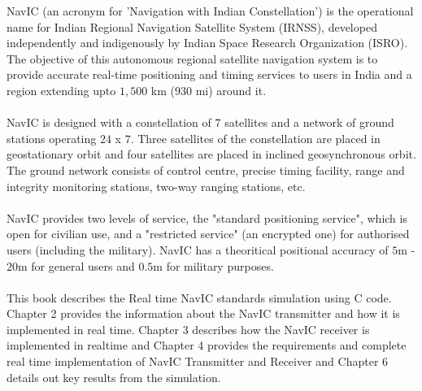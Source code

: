 




%


NavIC (an acronym for 'Navigation with Indian Constellation') is the operational name for Indian Regional Navigation Satellite System (IRNSS), developed independently and indigenously by Indian Space Research Organization (ISRO). The objective of this autonomous regional satellite navigation system is to provide accurate real-time positioning and timing services to users in India and a region extending upto $1,500$ km ($930$ mi) around it. 
\\
\\
NavIC is designed with a constellation of $7$ satellites and a network of ground stations operating $24$ x $7$. Three satellites of the constellation
are placed in geostationary orbit and four satellites are placed in inclined geosynchronous orbit. The ground network consists of control centre, precise timing facility, range and integrity monitoring stations, two-way ranging stations, etc.
\\
\\
NavIC provides two levels of service, the "standard positioning service", which is open for civilian use, and a "restricted service" (an encrypted one) for authorised users (including the military). NavIC has a theoritical positional accuracy of $5$m - $20$m for general users and $0.5$m for military purposes.
\\
\\
This book describes the Real time NavIC standards simulation using C code. Chapter 2 provides the information about the NavIC transmitter and how it is implemented in real time. Chapter 3 describes how the NavIC receiver is implemented in realtime and Chapter 4 provides the requirements and complete real time implementation of NavIC Transmitter and Receiver and Chapter 6 details out key
results from the simulation. 
\\
\\

